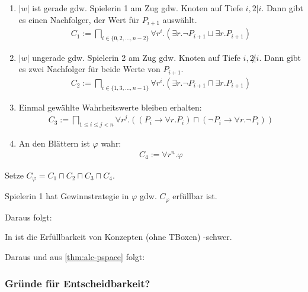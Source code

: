 \begin{enumerate}
    \item $|w|$ ist gerade gdw. Spielerin 1 am Zug gdw. Knoten auf Tiefe $i, 2|i$. Dann gibt es einen Nachfolger, der Wert für $P_{i + 1}$ auswählt.
        \begin{align*}
            C_1 := \bigsqcap_{i \in \{0, 2, \ldots, n - 2\}}
            \forall r^i.(\exists r.\neg P_{i + 1} \sqcup \exists r.P_{i + 1})
        \end{align*}
    \item $|w|$ ungerade gdw. Spielerin 2 am Zug gdw. Knoten auf Tiefe $i, 2 \not| i$. Dann gibt es zwei Nachfolger für beide Werte von $P_{i + 1}$.
        \begin{align*}
            C_2 := \bigsqcap_{i \in \{1, 3, \ldots, n - 1\}} 
            \forall r^i.(\exists r.\neg P_{i + 1} \sqcap \exists r.P_{i + 1})
        \end{align*}
    \item Einmal gewählte Wahrheitswerte bleiben erhalten:
        \begin{align*}
            C_3 := \bigsqcap_{1 \leq i \leq j < n} \forall r^j.\left( \left (
                    P_i \rightarrow \forall r.P_i
                    \right) \sqcap \left(
                    \neg P_i \rightarrow \forall r. \neg P_i
                \right)\right)
        \end{align*}
    \item An den Blättern ist $\varphi$ wahr:
        \begin{align*}
            C_4 := \forall r^n.\varphi
        \end{align*}
\end{enumerate}

Setze $C_\varphi = C_1 \sqcap C_2 \sqcap C_3 \sqcap C_4$.

\begin{lemma}
    Spielerin 1 hat Gewinnstrategie in $\varphi$ gdw. $C_\varphi$ erfüllbar ist.
\end{lemma}

Daraus folgt:

\begin{theorem}
    In \ALC ist die Erfüllbarkeit von Konzepten (ohne TBoxen) \PSpace-schwer.
\end{theorem}

Daraus und aus \autoref{thm:alc-pspace} folgt:

\subsubsection{Gründe für Entscheidbarkeit?}

